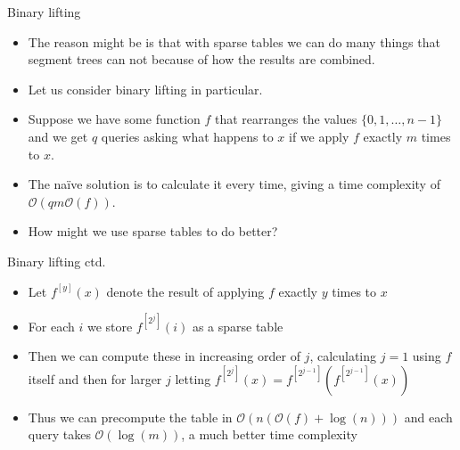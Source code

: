 \documentclass{beamer}
\begin{document}
\begin{frame}[plain]{Binary lifting}
    \begin{itemize}
        \item<1-> The reason might be is that with sparse tables we can do many things that segment trees can not because of how the results are combined.
        \item<2-> Let us consider binary lifting in particular.
        \item<3-> Suppose we have some function $f$ that rearranges the values $\{0, 1, \dots, n - 1\}$ and we get $q$ queries asking what happens to $x$ if we apply $f$ exactly $m$ times to $x$.
        \item<4-> The naïve solution is to calculate it every time, giving a time complexity of $\mathcal{O}(qm\mathcal{O}(f))$.
        \item<5-> How might we use sparse tables to do better?
    \end{itemize}
\end{frame}

\begin{frame}[plain]{Binary lifting ctd.}
    \begin{itemize}
        \item<1-> Let $f^{[y]}(x)$ denote the result of applying $f$ exactly $y$ times to $x$
        \item<2-> For each $i$ we store $f^{[2^j]}(i)$ as a sparse table
        \item<3-> Then we can compute these in increasing order of $j$, calculating $j = 1$ using $f$ itself and then for larger $j$ letting $f^{[2^j]}(x) = f^{[2^{j-1}]}(f^{[2^{j-1}]}(x))$
        \item<4-> Thus we can precompute the table in $\mathcal{O}(n(\mathcal{O}(f) + \log(n)))$ and each query takes $\mathcal{O}(\log(m))$, a much better time complexity
    \end{itemize}
\end{frame}
\end{document}
